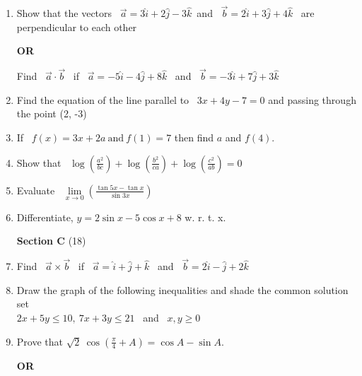 \documentclass[16pt,a4paper]{article}
\begin{document}
\begin {enumerate}
\item Show that the vectors \ $\vec a = 3\hat i+ 2\hat j-3\hat k$\ and \ $\vec b = 2\hat i + 3\hat j + 4\hat k$ \ are perpendicular to each other

\begin{center}
\textbf {OR}
\end{center}

Find \ $\vec a \cdot \vec b$ \ if \ $\vec a = -5\hat i - 4\hat j + 8\hat k$ \ and \ $\vec b = -3\hat i + 7\hat j + 3\hat k$

\item Find the equation of the line parallel to \ $3x + 4y -7 = 0$ and passing through the point (2, -3)

\item If \ $f(x) = 3x + 2a \ \text{and}\ f(1) = 7$ then find $a$ and $f(4)$.

\item Show that \ $ \log \left(\frac {a^2}{bc} \right) +\log \left(\frac {b^2}{ca} \right) +     
\log \left(\frac {c^2}{ab} \right) = 0 $

\item Evaluate \ \(\lim\limits_{x \to 0}
 \left(\frac{\tan 5x - \tan x}{\sin 3x} \right) \)

\item Differentiate, $ y = 2\sin x - 5 \cos x + 8 $ w. r. t. x. 


\begin{center}

\hfill \textbf{Section C} \tabto{16.9cm}(18)

\end{center}

\item Find \ $\vec a \times \vec b $ \ if \ $\vec a = \hat i + \hat j + \hat k $  \ and \ $\vec b = 2\hat i - \hat j + 2\hat k $

\item Draw the graph of the following inequalities and shade the common solution set \\ $2x + 5y \le 10,\ 7x + 3y \le 21$ \ and \ $ x, y \ge 0$

\item Prove that $\sqrt 2\ \cos \left( \frac {\pi}{4}+ A \right) = \cos A - \sin A$.

\begin{center}
\textbf {OR}
\end{center}


\end{enumerate}
\end{document}
